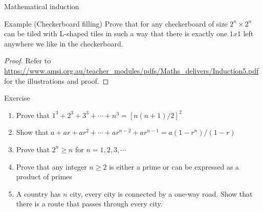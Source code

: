 \documentclass[10pt,xcolor={table,dvipsnames},t]{beamer}
\begin{document}
\begin{frame}{Mathematical induction}
  \begin{exampleblock}{Example (Checkerboard filling)}
    Prove that for any checkerboard of size $2^n\times 2^n$ can be tiled with L-shaped tiles in such a way that there is exactly one $1x1$ left anywhere we like in the checkerboard.
    \begin{proof}
      Refer to \url{https://www.amsi.org.au/teacher_modules/pdfs/Maths_delivers/Induction5.pdf} for the illustrations and proof.
    \end{proof}
  \end{exampleblock}
\end{frame}

\begin{frame}{Exercise}
  \begin{enumerate}
    \item Prove that $1^3 + 2 ^3 + 3^3 + \cdots + n^3 = \left[n(n+1)/2\right]^2$
    \item Show that $a+ar+ar^2 + \cdots + ar^{n-2}+ar^{n-1} = a(1-r^n)/(1-r)$
    \item Prove that $2^n \geq n$ for $n=1,2,3,\cdots$
    \item Prove that any integer $n\geq 2$ is either a prime or can be expressed as a product of primes
    \item A country has $n$ city, every city is connected by a one-way road. Show that there is a route that passes through every city.
  \end{enumerate}
\end{frame}
\end{document}
